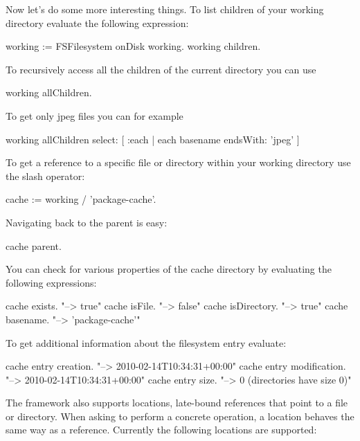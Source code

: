 \documentclass[a4paper,10pt,twoside]{book}
\begin{document}
Now let's do some more interesting things. To list children of your working directory evaluate the following expression:

\begin{code}{}
working := FSFilesystem onDisk working.
working children.
\end{code} 

To recursively access all the children of the current directory you can use 

\begin{code}{}
working allChildren.
\end{code}


To get only jpeg files you can for example 
\begin{code}{}
working allChildren select: [ :each | each basename endsWith: 'jpeg' ]
\end{code} 
 
To get a reference to a specific file or directory within your working directory use the slash operator:

\begin{code}{}
cache := working / 'package-cache'.
\end{code} 

Navigating back to the parent is easy:

\begin{code}{}
cache parent.
\end{code}

You can check for various properties of the cache directory by evaluating the following expressions:

\begin{code}{}
 cache exists.             "--> true"
 cache isFile.             "--> false"
 cache isDirectory.        "--> true"
 cache basename.           "--> 'package-cache'"
\end{code} 
 
To get additional information about the filesystem entry evaluate:

\begin{code}{}
 cache entry creation.     "--> 2010-02-14T10:34:31+00:00"
 cache entry modification. "--> 2010-02-14T10:34:31+00:00"
 cache entry size.         "--> 0 (directories have size 0)"
\end{code} 

The framework also supports locations, late-bound references that point to a file or directory. When asking to perform a concrete operation, a location behaves the same way as a reference. Currently the following locations are supported:
\end{document}
